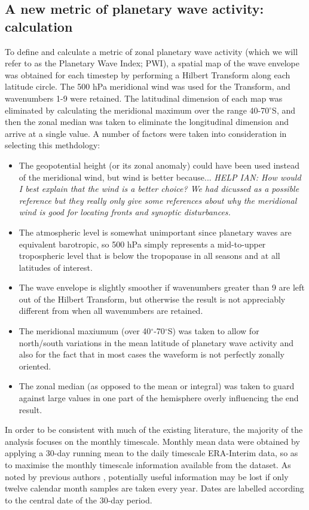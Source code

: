 \subsection{A new metric of planetary wave activity: calculation}

To define and calculate a metric of zonal planetary wave activity (which we will refer to as the Planetary Wave Index; PWI), a spatial map of the wave envelope was obtained for each timestep by performing a Hilbert Transform along each latitude circle. The 500 hPa meridional wind was used for the Transform, and wavenumbers 1-9 were retained. The latitudinal dimension of each map was eliminated by calculating the meridional maximum over the range 40-70$^{\circ}$S, and then the zonal median was taken to eliminate the longitudinal dimension and arrive at a single value. A number of factors were taken into consideration in selecting this methdology:
\begin{itemize}
\item The geopotential height (or its zonal anomaly) could have been used instead of the meridional wind, but wind is better because... \textit{HELP IAN: How would I best explain that the wind is a better choice? We had dicussed \citet{Hope2014} as a possible reference but they really only give some references about why the meridional wind is good for locating fronts and synoptic disturbances.}
\item The atmospheric level is somewhat unimportant since planetary waves are equivalent barotropic, so 500 hPa simply represents a mid-to-upper tropospheric level that is below the tropopause in all seasons and at all latitudes of interest.
\item The wave envelope is slightly smoother if wavenumbers greater than 9 are left out of the Hilbert Transform, but otherwise the result is not appreciably different from when all wavenumbers are retained.
\item The meridional maxiumum (over 40$^{\circ}$-70$^{\circ}$S) was taken to allow for north/south variations in the mean latitude of planetary wave activity and also for the fact that in most cases the waveform is not perfectly zonally oriented. 
\item The zonal median (as opposed to the mean or integral) was taken to guard against large values in one part of the hemisphere overly influencing the end result.
\end{itemize}

In order to be consistent with much of the existing literature, the majority of the analysis focuses on the monthly timescale. Monthly mean data were obtained by applying a 30-day running mean to the daily timescale ERA-Interim data, so as to maximise the monthly timescale information available from the dataset. As noted by previous authors \citep[e.g.][]{Kidson1988}, potentially useful information may be lost if only twelve calendar month samples are taken every year. Dates are labelled according to the central date of the 30-day period.   